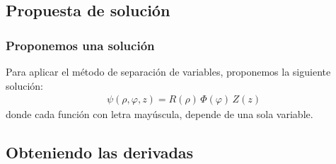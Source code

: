 \documentclass[12pt]{beamer}
\begin{document}
\subsection{Propuesta de solución}

\begin{frame}
\frametitle{Proponemos una solución}
Para aplicar el método de separación de variables, proponemos la siguiente solución:
\begin{align*}
\psi (\rho, \varphi, z) = R(\rho) \, \Phi (\varphi) \, Z(z)
\end{align*}
\pause
donde cada función con letra mayúscula, depende de una sola variable.
\end{frame}

\subsection{Obteniendo las derivadas}
\end{document}

